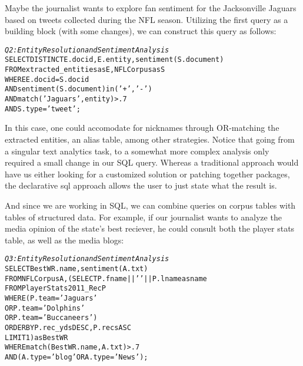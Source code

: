 Maybe the journalist wants to explore fan sentiment for the Jacksonville Jaguars
based on tweets collected during the NFL season. Utilizing the first 
query as a building block (with some changes), we can construct this 
query as follows:

\begin{small}
\begin{alltt}
\textit{Q2: Entity Resolution and Sentiment Analysis}
SELECT DISTINCT E.docid, E.entity, sentiment(S.document)
FROM extracted_entities as E, NFLCorpus as S
WHERE E.docid = S.docid
  AND sentiment(S.document) in ('+', '-')
  AND match('Jaguars', entity) > .7
  AND S.type = 'tweet';
\end{alltt}
\end{small}

In this case, one could accomodate for nicknames through OR-matching
the extracted entities, an alias table, among other strategies. Notice
that going from a singular text analytics task, to a somewhat more 
complex analysis only required a small change in our SQL query. 
Whereas a traditional approach would have us either looking for a
customized solution or patching together packages, the declarative
sql approach allows the user to just state what the result is.

And since we are working in SQL, we can combine queries on corpus 
tables with tables of structured data. For example, if our journalist
wants to analyze the media opinion of the state's best reciever,
he could consult both the player stats table, as well as the media blogs:

\begin{small}
\begin{alltt}
\textit{Q3: Entity Resolution and Sentiment Analysis}
SELECT BestWR.name, sentiment(A.txt)
FROM NFLCorpus A, (SELECT P.fname || ' ' || P.lname as name
                   FROM PlayerStats2011_Rec P
                   WHERE (P.team = 'Jaguars' 
                      OR P.team = 'Dolphins' 
                      OR P.team ='Buccaneers') 
                   ORDER BY P.rec_yds DESC, P.recs ASC
                   LIMIT 1) as BestWR
WHERE match(BestWR.name, A.txt) > .7
  AND (A.type = 'blog' OR A.type = 'News');
\end{alltt}
\end{small}


